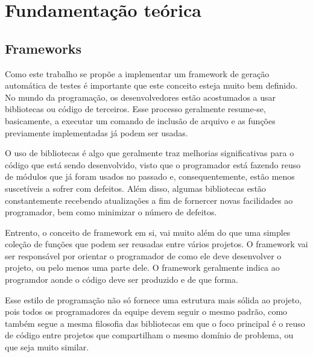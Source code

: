 \documentclass[
    12pt,       %
    openright,      %
    twoside,      %
    a4paper,      %
    english,      %
    french,       %
    spanish,      %
    brazil,       %
    ]{abntex2}
\begin{document}
  

  \part{Fundamentação teórica}

  \chapter{Frameworks}

      Como este trabalho se propõe a implementar um framework de geração
      automática de testes é importante que este conceito esteja muito bem
      definido. No mundo da programação, os desenvolvedores estão
      acostumados a usar bibliotecas ou código de terceiros. Esse processo
      geralmente resume-se, basicamente, a executar um comando de inclusão
      de arquivo e as funções previamente implementadas já podem ser usadas.

      O uso de bibliotecas é algo que geralmente traz melhorias significativas
      para o código que está sendo desenvolvido, visto que o programador
      está fazendo reuso de módulos que já foram usados no passado e,
      consequentemente, estão menos suscetíveis a sofrer com defeitos. Além
      disso, algumas bibliotecas estão constantemente recebendo atualizações
      a fim de fornercer novas facilidades ao programador, bem como minimizar
      o número de defeitos.

      Entrento, o conceito de framework em si, vai muito além do que uma
      simples coleção de funções que podem ser reusadas entre vários
      projetos. O framework vai ser
      responsável por orientar o programador de como ele deve desenvolver
      o projeto, ou pelo menos uma parte dele. O framework geralmente
      indica ao programdor aonde o código deve ser produzido e de que forma.

      Esse estilo de programação não só fornece uma estrutura mais sólida
      ao projeto, pois todos os programadores da equipe devem seguir o mesmo
      padrão, como também segue a mesma filosofia das bibliotecas em que o
      foco principal é o reuso de código entre projetos que compartilham
      o mesmo domínio de problema, ou que seja muito similar.
\end{document}
